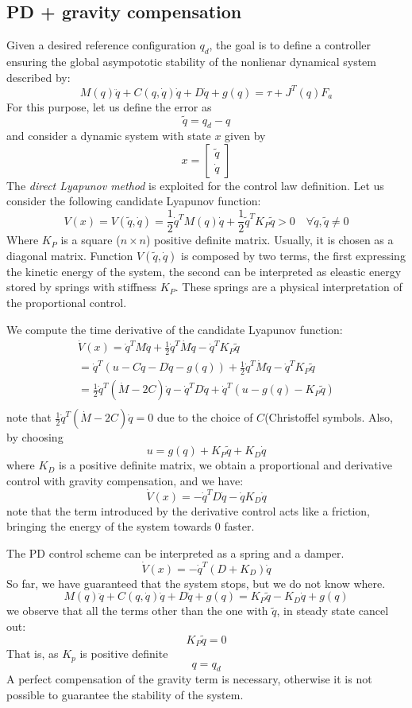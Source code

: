 \documentclass{book}
\begin{document}
\subsection{PD + gravity compensation}
Given a desired reference configuration $q_d$, the goal is to define a controller ensuring the global asympototic stability of the nonlienar dynamical system described by:
\[
    M(q)\ddot{q}+C(q,\dot{q})\dot{q}+D\dot{q}+g(q) = \tau + J^T(q)F_a
\]
For this purpose, let us define the error as
\[
    \tilde{q}=q_d-q
\]
and consider a dynamic system with state $x$ given by
\[
    x=\begin{bmatrix}
        \tilde{q}\\\dot{q}
    \end{bmatrix}
\]
The \emph{direct Lyapunov method} is exploited for the control law definition.
Let us consider the following candidate Lyapunov function:
\[
    V(x) = V(\tilde{q},\dot{q}) = \frac{1}{2}\dot{q}^TM(q)\dot{q}+\frac{1}{2}\tilde{q}^TK_P\tilde{q}>0 \quad \forall \dot{q},\tilde{q} \neq 0
\]
Where $K_P$ is a square ($n\times n$) positive definite matrix. Usually, it is chosen as a diagonal matrix. Function $V(\tilde{q},\dot{q})$ is composed by two terms, the first expressing the kinetic energy of the system, the second can be interpreted as eleastic energy stored by springs with stiffness $K_P$. These springs are a physical interpretation of the proportional control.

We compute the time derivative of the candidate Lyapunov function:
\begin{gather*}
    \dot{V}(x)=\dot{q}^TM\ddot{q}+\frac{1}{2}\dot{q}^T\dot{M}\dot{q}-\dot{q}^TK_P\tilde{q}\\
    =\dot{q}^T(u-C\dot{q}-D\dot{q}-g(q))+\frac{1}{2}\dot{q}^T\dot{M}\dot{q}-\dot{q}^TK_P\tilde{q}\\
    =\frac{1}{2}\dot{q}^T(\dot{M}-2C)\dot{q}-\dot{q}^TD\dot{q}+\dot{q}^T(u-g(q)-K_P\tilde{q})\\
\end{gather*}
note that $\frac{1}{2}\dot{q}^T(\dot{M}-2C)\dot{q}=0$ due to the choice of $C$(Christoffel symbols. Also, by choosing
\[
    u=g(q)+K_P\tilde{q}+K_D\dot{q}
\]
where $K_D$ is a positive definite matrix, we obtain a proportional and derivative control with gravity compensation, and we have:
\[
    \dot{V}(x)=-\dot{q}^TD\dot{q}-\dot{q}K_D\dot{q}
\]
note that the term introduced by the derivative control acts like a friction, bringing the energy of the system towards 0 faster.

The PD control scheme can be interpreted as a spring and a damper.
\[
    \dot{V}(x)=-\dot{q}^T(D+K_D)\dot{q}
\]
So far, we have guaranteed that the system stops, but we do not know where.
\[
    M(q)\ddot{q}+C(q,\dot{q})\dot{q}+D\dot{q}+g(q) = K_P\tilde{q}-K_D\dot{q}+g(q) 
\]
we observe that all the terms other than the one with $\tilde{q}$, in steady state cancel out:
\[
    K_P\tilde{q} = 0
\]
That is, as $K_p$ is positive definite
\[
    q=q_d
\]
A perfect compensation of the gravity term is necessary, otherwise it is not possible to guarantee the stability of the system.
\end{document}
